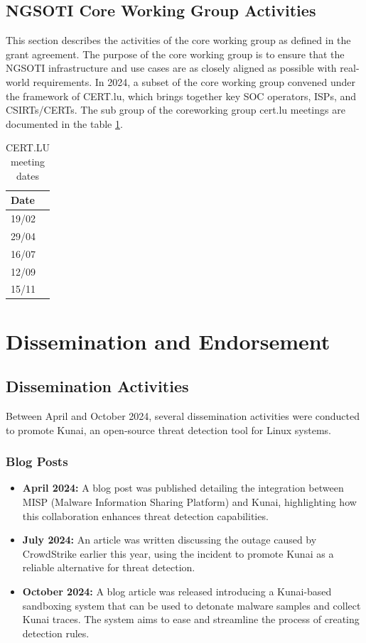 \section{NGSOTI Core Working Group Activities}
This section describes the activities of the core working group as defined in the grant agreement. The purpose of the core working group is to ensure that the NGSOTI infrastructure and use cases are as closely aligned as possible with real-world requirements. In 2024, a subset of the core working group convened under the framework of CERT.lu, which brings together key SOC operators, ISPs, and CSIRTs/CERTs.
The sub group of the coreworking group cert.lu meetings are documented in the table \ref{certlu}.

\begin{table}[H]
    \centering
    \begin{tabular}{l}
    Date\\
    \hline
    19/02\\
    29/04\\
    16/07\\
    12/09\\
    15/11\\
    \end{tabular}
    \caption{CERT.LU meeting dates}
    \label{certlu}
\end{table}

\chapter{Dissemination and Endorsement}\label{chdis}

\section*{Dissemination Activities}

Between April and October 2024, several dissemination activities were conducted to promote Kunai, an open-source threat detection tool for Linux systems.

\subsection*{Blog Posts}
\begin{itemize}
    \item \textbf{April 2024:} A blog post was published detailing the integration between MISP (Malware Information Sharing Platform) and Kunai, highlighting how this collaboration enhances threat detection capabilities.
    \item \textbf{July 2024:} An article was written discussing the outage caused by CrowdStrike earlier this year, using the incident to promote Kunai as a reliable alternative for threat detection.
    \item \textbf{October 2024:} A blog article was released introducing a Kunai-based sandboxing system that can be used to detonate malware samples and collect Kunai traces. The system aims to ease and streamline the process of creating detection rules.
\end{itemize}

